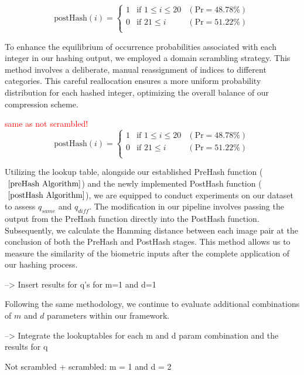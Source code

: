{\renewcommand{\arraystretch}{1.25}
\[
\text{postHash}(i) = \left\{
    \begin{array}{lll}
        \text{1}  & \text{if } 1 \leq i \leq 20 & (\text{Pr} = 48.78\%)
        \\
        \text{0}  & \text{if } 21 \leq i & (\text{Pr} = 51.22\%)
        \\
    \end{array}
\right.    
\]}

To enhance the equilibrium of occurrence probabilities associated with each integer in our hashing output, we employed a domain scrambling strategy. This method involves a deliberate, manual reassignment of indices to different categories. This careful reallocation ensures a more uniform probability distribution for each hashed integer, optimizing the overall balance of our compression scheme. 

\textcolor{red}{same as not scrambled!}
{\renewcommand{\arraystretch}{1.25}
\[
\text{postHash}(i) = \left\{
    \begin{array}{lll}
        \text{1}  & \text{if } 1 \leq i \leq 20 & (\text{Pr} = 48.78\%)
        \\
        \text{0}  & \text{if } 21 \leq i & (\text{Pr} = 51.22\%)
        \\
    \end{array}
\right.    
\]}

Utilizing the lookup table, alongside our established PreHash function (\(~\ref{preHash Algorithm}\)) and the newly implemented PostHash function (\(~\ref{postHash Algorithm}\)), we are equipped to conduct experiments on our dataset to assess \(q_{same}\) and \(q_{diff}\). The modification in our pipeline involves passing the output from the PreHash function directly into the PostHash function. Subsequently, we calculate the Hamming distance between each image pair at the conclusion of both the PreHash and PostHash stages. This method allows us to measure the similarity of the biometric inputs after the complete application of our hashing process.

--> Insert results for q's for m=1 and d=1


Following the same methodology, we continue to evaluate additional combinations of \(m\) and \(d\) parameters within our framework.

--> Integrate the lookuptables for each m and d param combination and the results for q

Not scrambled + scrambled: m = 1 and d = 2

